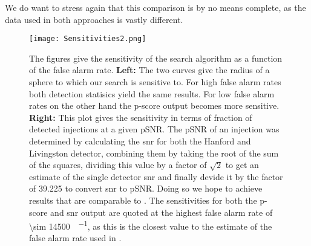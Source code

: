 We do want to stress again that this comparison is by no means complete, as the data used in both approaches is vastly different.\medskip\\
\begin{figure}
\centering
\texttt{[image: Sensitivities2.png]}
\caption[Sensitivities of single outputs]{The figures give the sensitivity of the search algorithm as a function of the false alarm rate. \textbf{Left:} The two curves give the radius of a sphere to which our search is sensitive to. For high false alarm rates both detection statisics yield the same results. For low false alarm rates on the other hand the p-score output becomes more sensitive. \textbf{Right:} This plot gives the sensitivity in terms of fraction of detected injections at a given pSNR. The pSNR of an injection was determined by calculating the \gls{snr} for both the Hanford and Livingston detector, combining them by taking the root of the sum of the squares, dividing this value by a factor of $\sqrt{2}$ to get an estimate of the single detector \gls{snr} and finally devide it by the factor of 39.225 to convert \gls{snr} to pSNR. Doing so we hope to achieve results that are comparable to \cite{bns_network}. The sensitivities for both the p-score and \gls{snr} output are quoted at the highest false alarm rate of \SI[per-mode=fraction]{\sim 14500}{\samples\per\month}, as this is the closest value to the estimate of the false alarm rate used in \cite{bns_network}.}\label{fig:sensitivities}
\end{figure}
